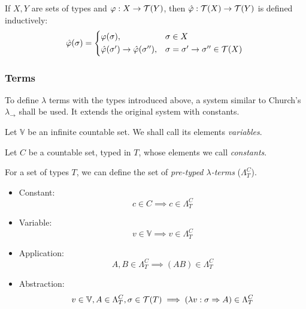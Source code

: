 \documentclass[main.tex]{subfiles}
\begin{document}
\begin{defn}
    If $X, Y$ are sets of types and $\varphi: X \rightarrow \mathcal{T}( Y )$,
    then $\hat{\varphi} : \mathcal{T}( X ) \rightarrow \mathcal{T}( Y )$ is defined inductively:
    \begin{equation*}
        \hat{\varphi}(\sigma) =
        \begin{cases*}
            \varphi(\sigma), & $\sigma \in X$ \\
            \hat{\varphi}(\sigma') \rightarrow \hat{\varphi}(\sigma''), &
                $\sigma = \sigma' \rightarrow \sigma'' \in \tclos{X}$ \\
        \end{cases*}
    \end{equation*}
\end{defn}

\subsubsection{Terms}
To define $\lambda$ terms with the types introduced above, a system similar
to Church's $\lambda_\rightarrow$ \cite[chap.~2.4]{ttfp} shall be used. It
extends the original system with constants.

\begin{defn}
    Let $\mathbb{V}$ be an infinite countable set. We shall call its elements
    \emph{variables}.
\end{defn}

\begin{defn}
    Let $C$ be a countable set, typed in $T$,
    whose elements we call \emph{constants}.

    For a set of types $T$, we can define the set of
    \emph{pre-typed $\lambda$-terms} ($\Lambda_T^C$).

    \begin{itemize}
        \item Constant:    \[ c \in C \implies c \in \Lambda_T^C \]
        \item Variable:    \[ v \in \mathbb{V} \implies v \in \Lambda_T^C \]
        \item Application: \[ A, B \in \Lambda_T^C \implies (AB) \in \Lambda_T^C \]
        \item Abstraction: \[ v \in \mathbb{V}, A \in \Lambda_T^C, \sigma \in \mathcal{T}( T )
                \implies (\lambda v : \sigma \Rightarrow A) \in \Lambda_T^C \]
    \end{itemize}
\end{defn}
\end{document}
